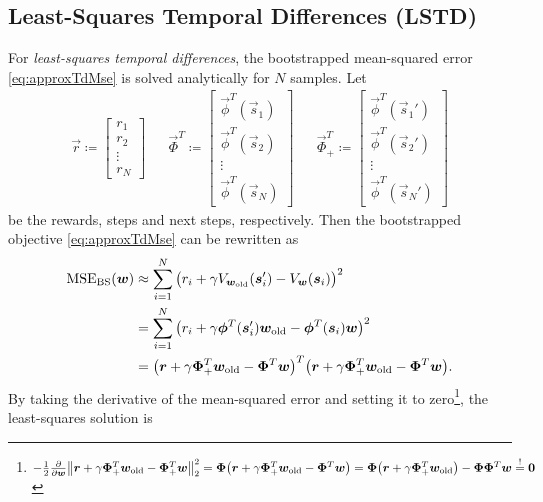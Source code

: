		\subsection{Least-Squares Temporal Differences (LSTD)}
			For \emph{least-squares temporal differences}, the bootstrapped mean-squared error \eqref{eq:approxTdMse} is solved analytically for \(N\) samples. Let
			\begin{align*}
				\vec{r} \coloneqq
				\begin{bmatrix}
					r_1    \\
					r_2    \\
					\vdots \\
					r_N
				\end{bmatrix}
				 &  &
				\vec{\Phi}^T \coloneqq
				\begin{bmatrix}
					\vec{\phi}^T(\vec{s}_1) \\
					\vec{\phi}^T(\vec{s}_2) \\
					\vdots                  \\
					\vec{\phi}^T(\vec{s}_N)
				\end{bmatrix}
				 &  &
				\vec{\Phi}_+^T \coloneqq
				\begin{bmatrix}
					\vec{\phi}^T(\vec{s}_1') \\
					\vec{\phi}^T(\vec{s}_2') \\
					\vdots                   \\
					\vec{\phi}^T(\vec{s}_N')
				\end{bmatrix}
			\end{align*}
			be the rewards, steps and next steps, respectively. Then the bootstrapped objective \eqref{eq:approxTdMse} can be rewritten as
			\begin{align*}
				\operatorname{MSE}_\mathrm{BS}(\bm{w})
				 & \approx \sum_{i = 1}^{N} \big( r_i + \gamma V_{\bm{w}_\mathrm{old}}(\bm{s}_i') - V_{\bm{w}}(\bm{s}_i) \big)^2                                                                    \\
				 & = \sum_{i = 1}^{N} \big( r_i + \gamma \bm{\phi}^T(\bm{s}_i') \bm{w}_\mathrm{old} - \bm{\phi}^T(\bm{s}_i) \bm{w} \big)^2                                                        \\
				 & = \big( \bm{r} + \gamma \bm{\Phi}_+^T \bm{w}_\mathrm{old} - \bm{\Phi}^T \bm{w} \big)^T \big( \bm{r} + \gamma \bm{\Phi}_+^T \bm{w}_\mathrm{old} - \bm{\Phi}^T \bm{w} \big).
			\end{align*}
			By taking the derivative of the mean-squared error and setting it to zero\footnote{\( -\frac{1}{2} \pdv{\bm{w}} \big\lVert \bm{r} + \gamma \bm{\Phi}_+^T \bm{w}_\mathrm{old} - \bm{\Phi}_+^T \bm{w} \big\rVert_2^2 = \bm{\Phi} \big( \bm{r} + \gamma \bm{\Phi}_+^T \bm{w}_\mathrm{old} - \bm{\Phi}^T \bm{w} \big) = \bm{\Phi} \big( \bm{r} + \gamma \bm{\Phi}_+^T \bm{w}_\mathrm{old} \big) - \bm{\Phi} \bm{\Phi}^T \bm{w} \overset{!}{=} \bm{0} \)}, the least-squares solution is
